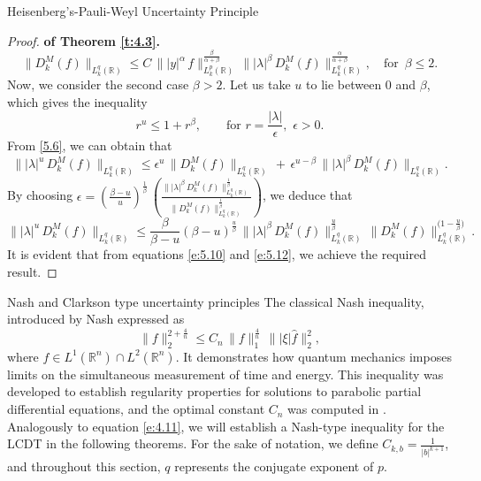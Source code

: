 \documentclass[12pt,a4paper,reqno]{amsproc}
\theoremstyle{definition}
\theoremstyle{remark}
\numberwithin{equation}{section}
\begin{document}
\begin{subsection}{Heisenberg's-Pauli-Weyl Uncertainty Principle}
\begin{proof} {\bf of Theorem \ref{t:4.3}.}
\begin{equation} \label{e:5.10}
    \|D_k^M(f)\|_{L^{q}_k(\mathbb{R})} \le C\, \||y|^\alpha\,f\|^{\frac{\beta}{\alpha+\beta}}_{L_k^p(\mathbb{R})}\, \||\lambda|^\beta\, D_k^M(f)\|^{\frac{\alpha}{\alpha+\beta}}_{L_k^{q}(\mathbb{R})}, \quad \text{for} \,\,\,\beta\le 2.
\end{equation}
 Now, we consider the second case $\beta >2$. Let us take $u$ to lie between $0$ and $\beta$, which gives the inequality
\begin{equation}\label{5.6}
    r^{u} \le 1+r^{\beta}, \qquad\text{for}\,\, r= \frac{|\lambda|}{\epsilon}, \,\,\epsilon >0.
\end{equation}
From \eqref{5.6}, we can obtain that
\begin{equation*}
\| |\lambda|^{u} \, D_k^M(f)\|_{L^{q}_k(\mathbb{R})} \le \epsilon^{u}\, \|D_k^M(f)\|_{L^{q}_k(\mathbb{R})}\,+\, \epsilon^{u-\beta}\, \| |\lambda|^{\beta}\, D_k^M(f)\|_{L^{q}_k(\mathbb{R})}.
\end{equation*}
By choosing 
$\epsilon = \left( \frac{\beta-u}{u}\right)^{\frac{1}{\beta}} \, 
\left(\frac{\||\lambda|^\beta\, D_k^M(f)\|^{\frac{1}{\beta}}_{L_k^{q}(\mathbb{R})}}{\|D_k^M(f)\|^{\frac{1}{\beta}}_{L_k^{q}(\mathbb{R})}}\right)$, we deduce that
\begin{equation} \label{e:5.12}
\| |\lambda|^{u} \, D_k^M(f)\|_{L^{q}_k(\mathbb{R})} \le \frac{\beta}{\beta-u}(\beta-u)^\frac{u}{\beta}\,\||\lambda|^\beta\, D_k^M(f)\|^{\frac{u}{\beta}}_{L_k^{q}(\mathbb{R})}\,\|D_k^M(f)\|^{(1-{\frac{u}{\beta})}}_{L_k^{q}(\mathbb{R})}. 
\end{equation}
It is evident that from equations \eqref{e:5.10} and \eqref{e:5.12}, we achieve the required result.
\end{proof}

\begin{subsection}{Nash and Clarkson type uncertainty principles}
 The classical Nash inequality, introduced by Nash \cite{nash1958continuity} expressed as
\begin{equation}\label{e:4.11}
    \|f\|_2^{2+\frac{4}{n}}\le C_n\,\|f\|^{\frac{4}{n}}_{1}\, \||\xi| \hat{f}\|^2_2,
\end{equation}
where  $f\in L^1(\mathbb{R}^n)\cap L^2(\mathbb{R}^n)$.  It demonstrates how quantum mechanics imposes limits on the simultaneous measurement of time and energy. This inequality was developed to establish regularity properties for solutions to parabolic partial differential equations, and the optimal constant
 $C_n$ was computed in  \cite{carlen1993sharp}. Analogously to equation \eqref{e:4.11}, we will establish a Nash-type inequality for the LCDT in the following theorems. For the sake of notation, we define $C_{k,b} = \frac{1}{|b|^{k+1}}$, and throughout this section, $q$ represents the conjugate exponent of $p$.


\end{subsection}
\end{subsection}
\end{document}
